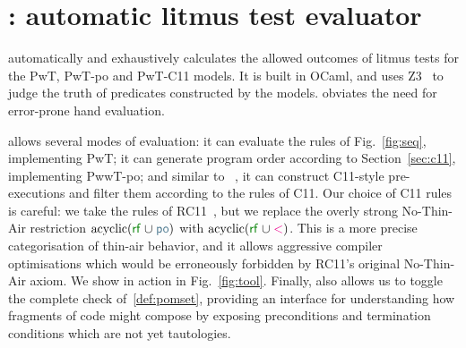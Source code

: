 \section{\PwTerTITLE: automatic litmus test evaluator}
\label{sec:tool}

\PwTer{} automatically and exhaustively calculates the allowed outcomes of litmus tests for the PwT, PwT-po and PwT-C11 models. It is built in OCaml, and uses Z3~\cite{Z3Solver} to judge the truth of predicates constructed by the models. \PwTer{} obviates the need for error-prone hand evaluation.

\PwTer{} allows several modes of evaluation: it can evaluate the rules of Fig.~\ref{fig:seq}, implementing PwT; it can generate program order according to Section~\ref{sec:c11}, implementing PwwT-po; and similar to \MRD~\cite{DBLP:conf/esop/PaviottiCPWOB20}, it can construct C11-style pre-executions and filter them according to the rules of C11.
Our choice of C11 rules is careful: we take the rules of RC11~\cite{DBLP:conf/pldi/LahavVKHD17}, but we replace the overly strong No-Thin-Air restriction $\text{acyclic}(\rrf\cup\rpox)$ with $\text{acyclic}(\rrf\cup\lt)$. 
This is a more precise categorisation of thin-air behavior, and it allows aggressive compiler optimisations which would be erroneously forbidden by RC11's original No-Thin-Air axiom.
We show \PwTer{} in action in Fig.~\ref{fig:tool}.
Finally, \PwTer{} also allows us to toggle the complete check of~\ref{def:pomset}, providing an interface for understanding how fragments of code might compose by exposing preconditions and termination conditions which are not yet tautologies.






